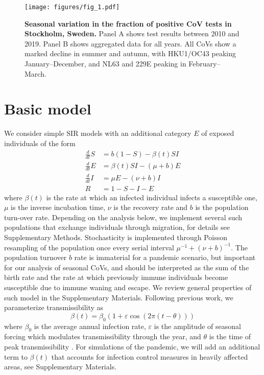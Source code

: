 \documentclass[rmp, reprint, superscriptaddress, floatfix,amsmath]{revtex4-1}
\newcommand{\Jan}[1]{{\color{deepsaffron}Jan: #1}}
\newcommand{\Emma}[1]{{\color{purple}Emma: #1}}
\newcommand{\forcing}{\varepsilon}
\begin{document}
\begin{figure}
    \centering
    \texttt{[image: figures/fig\_1.pdf]}
    \caption{{\bf Seasonal variation in the fraction of positive CoV tests in Stockholm, Sweden.} Panel A shows test results between 2010 and 2019. Panel B shows aggregated data for all years. All CoVs show a marked decline in summer and autumn, with HKU1/OC43 peaking January--December, and NL63 and 229E peaking in February--March. %
    }
    \label{fig:seasonal_CoV}
\end{figure}

\section{Basic model}
We consider simple SIR models \citep{kermack_contributions_1991} with an additional category $E$ of exposed individuals of the form
\begin{equation}
\begin{split}
\frac{d}{dt} S & = b(1-S) - \beta(t) S I \\
\frac{d}{dt} E & = \beta(t) S I - (\mu +b) E\\
\frac{d}{dt} I & = \mu E - (\nu+b) I \\
R & = 1-S-I-E
\end{split}
\label{eq:SIR}
\end{equation}
where $\beta(t)$ is the rate at which an infected individual infects a susceptible one, $\mu$ is the inverse incubation time, $\nu$ is the recovery rate and $b$ is the population turn-over rate.
Depending on the analysis below, we implement several such populations that exchange individuals through migration, for details see Supplementary Methods.
Stochasticity is implemented through Poisson resampling of the population once every serial interval $\mu^{-1}+(\nu+b)^{-1}$.
The population turnover $b$ rate is immaterial for a pandemic scenario, but important for our analysis of seasonal CoVs, and should be interpreted as the sum of the birth rate and the rate at which previously immune individuals become susceptible due to immune waning and escape.
We review general properties of such model in the Supplementary Materials.
Following previous work, we parameterize transmissibility as
\begin{equation}
\beta(t) = \beta_0\left(1+\forcing\cos(2\pi (t-\theta))\right)
\label{eq:transmissibility}
\end{equation}
where $\beta_0$ is the average annual infection rate, $\forcing$ is the amplitude of seasonal forcing which modulates transmissibility through the year, and $\theta$ is the time of peak transmissibility \citep{dushoff_dynamical_2004,chen_regular_2017}.
For simulations of the pandemic, we will add an additional term to $\beta(t)$ that accounts for infection control measures in heavily affected areas, see Supplementary Materials.
\end{document}
